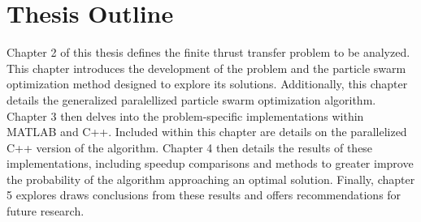 \section{Thesis Outline}

\noindent Chapter 2 of this thesis defines the finite thrust transfer problem to be analyzed. This chapter introduces the development of the problem
and the particle swarm optimization method designed to explore its solutions. Additionally, this chapter details the generalized paralellized particle swarm optimization algorithm.
Chapter 3 then delves into the problem-specific implementations within MATLAB and C++. Included within
this chapter are details on the parallelized C++ version of the algorithm. 
Chapter 4 then details the results of these implementations, including speedup comparisons and methods to greater improve the probability of the algorithm approaching an optimal solution.
Finally, chapter 5 explores draws conclusions from these results and offers recommendations for future research. 